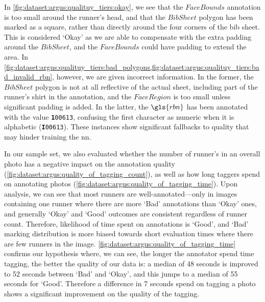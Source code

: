 In \cref{fig:dataset:argus:qualituy_tiers:okay}, we see that the $FaceBounds$ annotation is too small around the runner's head, and that the $BibSheet$ polygon has been marked as a square, rather than directly around the four corners of the bib sheet. This is considered `Okay' as we are able to compensate with the extra padding around the $BibSheet$, and the $FaceBounds$ could have padding to extend the area. In \cref{fig:dataset:argus:qualituy_tiers:bad_polygons,fig:dataset:argus:qualituy_tiers:bad_invalid_rbn}, however, we are given incorrect information. In the former, the $BibSheet$ polygon is not at all reflective of the actual sheet, including part of the runner's shirt in the annotation, and the $FaceRegion$ is too small unless significant padding is added. In the latter, the $\gls{rbn}$ has been annotated with the value \texttt{\textbf{1}00613}, confusing the first character as numeric when it is alphabetic (\texttt{\textbf{I}00613}). These instances show significant fallbacks to quality that may hinder training the \gls{nn}.

In our sample set, we also evaluated whether the number of runner's in an overall photo has a negative impact on the annotation quality (\cref{fig:dataset:argus:quality_of_tagging_count}), as well as how long taggers spend on annotating photos (\cref{fig:dataset:argus:quality_of_tagging_time}). Upon analysis, we can see that most runners are well-annotated---only in images containing one runner where there are more `Bad' annotations than `Okay' ones, and generally `Okay' and `Good' outcomes are consistent regardless of runner count. Therefore, likelihood of time spent on annotations is `Good', and `Bad' marking distribution is more biased towards short evaluation times where there are few runners in the image. \cref{fig:dataset:argus:quality_of_tagging_time} confirms our hypothesis where, we can see, the longer the annotator spend time tagging, the better the quality of our data is: a median of 48 seconds is improved to 52 seconds between `Bad' and `Okay', and this jumps to a median of 55 seconds for `Good'. Therefore a difference in 7 seconds spend on tagging a photo shows a significant improvement on the quality of the tagging.

\clearpage

